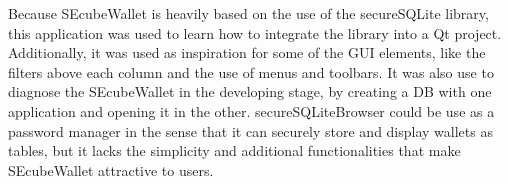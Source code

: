 Because SEcubeWallet is heavily based on the use of the secureSQLite library, this application was used to learn how to integrate the library into a Qt project. Additionally, it was used as inspiration for some of the GUI elements, like the filters above each column and the use of menus and toolbars. It was also use to diagnose the SEcubeWallet in the developing stage, by creating a DB with one application and opening it in the other. secureSQLiteBrowser could be use as a password manager in the sense that it can securely store and display wallets as tables, but it lacks the simplicity and additional functionalities that make SEcubeWallet attractive to users.